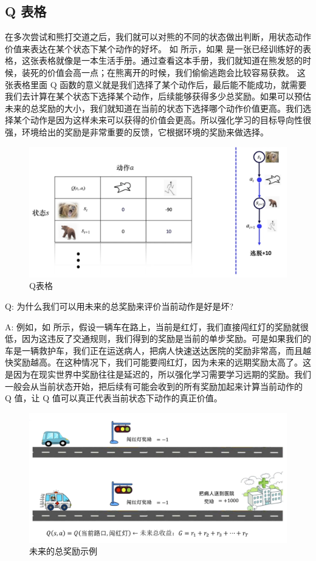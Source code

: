 \subsection{Q 表格} 

在多次尝试和熊打交道之后，我们就可以对熊的不同的状态做出判断，用状态动作价值来表达在某个状态下某个动作的好坏。
如 所示，如果 是一张已经训练好的表格，这张表格就像是一本生活手册。通过查看这本手册，我们就知道在熊发怒的时候，装死的价值会高一点；在熊离开的时候，我们偷偷逃跑会比较容易获救。
这张表格里面 Q 函数的意义就是我们选择了某个动作后，最后能不能成功，就需要我们去计算在某个状态下选择某个动作，后续能够获得多少总奖励。如果可以预估未来的总奖励的大小，我们就知道在当前的状态下选择哪个动作价值更高。我们选择某个动作是因为这样未来可以获得的价值会更高。所以强化学习的目标导向性很强，环境给出的奖励是非常重要的反馈，它根据环境的奖励来做选择。

\begin{figure}[htb]
	\centering
	\includegraphics[width=0.4\linewidth]{res/ch3/3.4}
	\caption{Q表格}
	\label{fig:fig3.4}
\end{figure}

Q: 为什么我们可以用未来的总奖励来评价当前动作是好是坏?

A: 例如，如 所示，假设一辆车在路上，当前是红灯，我们直接闯红灯的奖励就很低，因为这违反了交通规则，我们得到的奖励是当前的单步奖励。可是如果我们的车是一辆救护车，我们正在运送病人，把病人快速送达医院的奖励非常高，而且越快奖励越高。在这种情况下，我们可能要闯红灯，因为未来的远期奖励太高了。这是因为在现实世界中奖励往往是延迟的，所以强化学习需要学习远期的奖励。我们一般会从当前状态开始，把后续有可能会收到的所有奖励加起来计算当前动作的 Q 值，让 Q 值可以真正代表当前状态下动作的真正价值。

\begin{figure}[htb]
	\centering
	\includegraphics[width=0.5\linewidth]{res/ch3/3.5}
	\caption{未来的总奖励示例}
	\label{fig:fig3.5}
\end{figure}

